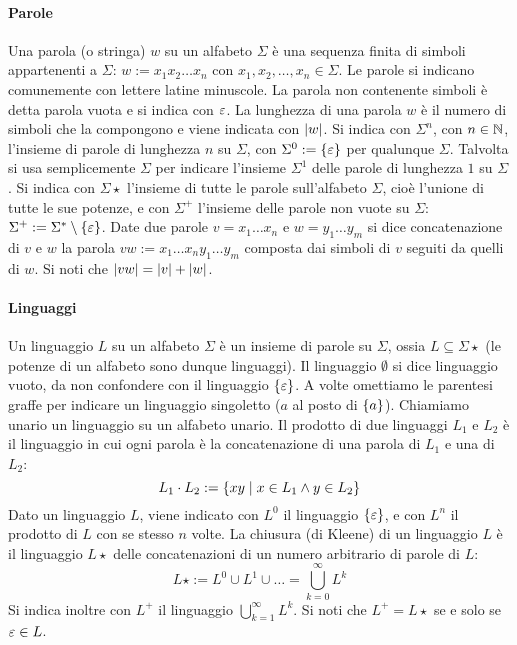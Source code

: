 \paragraph{Parole} Una parola (o stringa) $w$ su un alfabeto $\Sigma$ è una sequenza finita di simboli appartenenti a $\Sigma$: $w:=x_1 x_2 \dots x_n$ con $x_1,x_2,\dots,x_n\in\Sigma$. Le parole si indicano comunemente con lettere latine minuscole. La parola non contenente simboli è detta parola vuota e si indica con $\varepsilon$. La lunghezza di una parola $w$ è il numero di simboli che la compongono e viene indicata con $|w|$. Si indica con $\Sigma^n$, con $n\in\mathbb N$, l'insieme di parole di lunghezza $n$ su $\Sigma$, con $\Sigma^0:=\left\{ \varepsilon \right\}$ per qualunque $\Sigma$. Talvolta si usa semplicemente $\Sigma$ per indicare l'insieme $\Sigma^1$ delle parole di lunghezza $1$ su $\Sigma$. Si indica con $\Sigma\star$ l'insieme di tutte le parole sull'alfabeto $\Sigma$, cioè l'unione di tutte le sue potenze, e con $\Sigma^+$ l'insieme delle parole non vuote su $\Sigma$: $\Sigma^+ := \Sigma^*\setminus\left\{ \varepsilon \right\}$. Date due parole $v=x_1\dots x_n$ e $w=y_1\dots y_m$ si dice concatenazione di $v$ e $w$ la parola $vw:=x_1\dots x_n y_1\dots y_m$ composta dai simboli di $v$ seguiti da quelli di $w$. Si noti che $|vw|=|v|+|w|$.

\paragraph{Linguaggi} Un linguaggio $L$ su un alfabeto $\Sigma$ è un insieme di parole su $\Sigma$, ossia $L\subseteq\Sigma\star$ (le potenze di un alfabeto sono dunque linguaggi). Il linguaggio $\emptyset$ si dice linguaggio vuoto, da non confondere con il linguaggio $\left\{ \varepsilon \right\}$.  A volte omettiamo le parentesi graffe per indicare un linguaggio singoletto ($a$ al posto di $\left\{ a \right\}$). Chiamiamo unario un linguaggio su un alfabeto unario. Il prodotto di due linguaggi $L_1$ e $L_2$ è il linguaggio in cui ogni parola è la concatenazione di una parola di $L_1$ e una di $L_2$:
\begin{equation*}
	L_1\cdot L_2 := \left\{ xy\mid x\in L_1 \land y\in L_2 \right\}
\end{equation*}
Dato un linguaggio $L$, viene indicato con $L^0$ il linguaggio $\left\{ \varepsilon \right\}$, e con $L^n$ il prodotto di $L$ con se stesso $n$ volte. La chiusura (di Kleene) di un linguaggio $L$ è il linguaggio $L\star$ delle concatenazioni di un numero arbitrario di parole di $L$:
\begin{equation*}
	L\star := L^0\cup L^1\cup\dots=\bigcup_{k=0}^\infty L^k
\end{equation*}
Si indica inoltre con $L^+$ il linguaggio $\bigcup_{k=1}^\infty L^k$. Si noti che $L^+=L\star$ se e solo se $\varepsilon\in L$.


